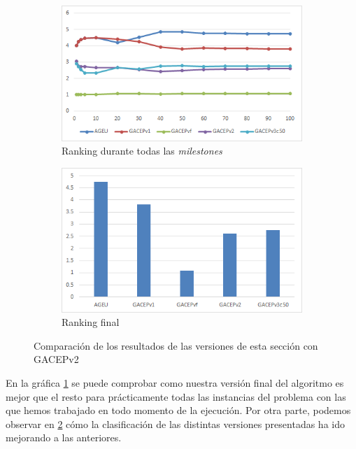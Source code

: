 \begin{figure}[h]
     \centering
     \begin{subfigure}[b]{0.45\textwidth}
         \centering
         \includegraphics[width=\textwidth]{imagenes/Experimental/Final.png}
         \caption{Ranking durante todas las \textit{milestones}}
         \label{fig:Final_lineas}
     \end{subfigure}
     \hfill
     \begin{subfigure}[b]{0.45\textwidth}
         \centering
         \includegraphics[width=\textwidth]{imagenes/Experimental/barras/Final.png}
         \caption{Ranking final}
         \label{fig:Final_barras}
     \end{subfigure}
        \caption{Comparación de los resultados de las versiones de esta sección con GACEPv2}
        \label{fig:Final}
\end{figure}

En la gráfica \ref{fig:Final_lineas} se puede comprobar como nuestra versión final del algoritmo es mejor que el resto para prácticamente todas las instancias del problema con las que hemos trabajado en todo momento de la ejecución. 
Por otra parte, podemos observar en \ref{fig:Final_barras} cómo la clasificación de las distintas versiones presentadas ha ido mejorando a las anteriores.

